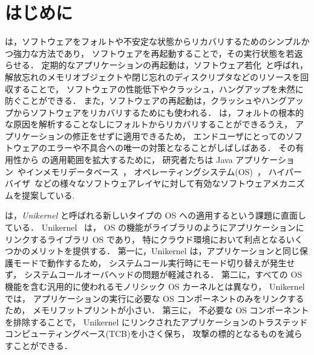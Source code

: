 \section{はじめに} \label{sec:introduction}

\rr は，ソフトウェアをフォルトや不安定な状態からリカバリするためのシンプルかつ強力な方法であり，
ソフトウェアを再起動することで，その実行状態を若返らせる．
定期的なアプリケーションの再起動は，ソフトウェア若化~\cite{HuangEtAl-rejuvenation,CotroneoEtAl-rejuvenation-survey,CotroneoEtAl-Surv14}と呼ばれ，
解放忘れのメモリオブジェクトや閉じ忘れのディスクリプタなどのリソースを回収することで，
ソフトウェアの性能低下やクラッシュ，ハングアップを未然に防ぐことができる．
また，ソフトウェアの再起動は，クラッシュやハングアップからソフトウェアをリカバリするためにも使われる．
\rr は，フォルトの根本的な原因を解析することなしにフォルトからリカバリすることができるうえ，
アプリケーションの修正をせずに適用できるため，
エンドユーザにとってのソフトウェアのエラーや不具合への唯一の対策となることがしばしばある．
その有用性から \rr の適用範囲を拡大するために，
研究者たちは Java アプリケーション~\cite{CandeaEtAl-Microreboot}やインメモリデータベース~\cite{JumonjiEtAl-WoSAR17,JumonjiEtAl-IEICE2021}，
オペレーティングシステム(OS)~\cite{YamakitaEtAl-PBR,DepoutovitchEtAl-otherworld,KouraiEtAl-cachemind,TeradaEtAl-Dwarf,BovenziEtAl-ISSRE13}，
ハイパーバイザ~\cite{KouraiEtAl-Roothammer,KouraiEtAl-TDSC,LeEtAl-VEE11}などの様々なソフトウェアレイヤに対して有効なソフトウェアメカニズムを提案している.

\rr は，\emph{Unikernel} と呼ばれる新しいタイプの OS への適用するという課題に直面している．
Unikernel ~\cite{MadhavapeddyEtAl-Unikernel,KivityEtAl-OSv,SartakovEtAl-ASPLOS21,KanteeEtAl-rumprun,KuenzerEtAl-Unikraft}は，
OS の機能がライブラリのようにアプリケーションにリンクするライブラリ OS であり，
特にクラウド環境において利点となるいくつかのメリットを提供する．
第一に，Unikernel は，アプリケーションと同じ保護モードで動作するため，
システムコール実行時にモード切り替えが発生せず，
システムコールオーバヘッドの問題が軽減される．
第二に，すべての OS 機能を含む汎用的に使われるモノリシック OS カーネルとは異なり，
Unikernel では，
アプリケーションの実行に必要な OS コンポーネントのみをリンクするため，
メモリフットプリントが小さい．
第三に，
不必要な OS コンポーネントを排除することで，
Unikernel にリンクされたアプリケーションのトラステッドコンピューティングベース(TCB)を小さく保ち，
攻撃の標的となるものを減らすことができる．

